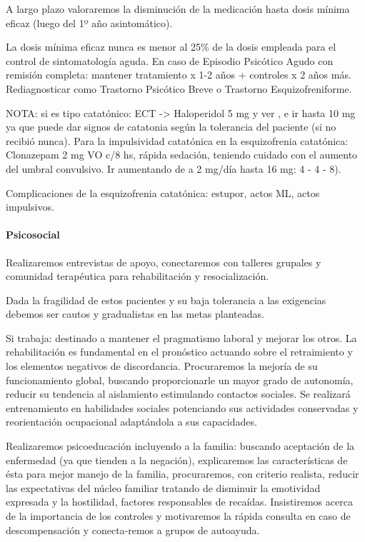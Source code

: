 A largo plazo valoraremos la disminución de la medicación hasta dosis mínima eficaz (luego del 1º año asintomático).

La dosis mínima eficaz nunca es menor al 25\% de la dosis empleada para el control de sintomatología aguda. En caso de Episodio Psicótico Agudo con remisión completa: mantener tratamiento x 1-2 años + controles x 2 años más. Rediagnosticar como Trastorno Psicótico Breve o Trastorno Esquizofreniforme.

NOTA: si es tipo catatónico: ECT -> Haloperidol 5 mg y ver , e ir hasta 10 mg ya que puede dar signos de catatonia según la tolerancia del paciente (si no recibió nunca). Para la impulsividad catatónica en la esquizofrenia catatónica: Clonazepam 2 mg VO c/8 hs, rápida sedación, teniendo cuidado con el aumento del umbral convulsivo. Ir aumentando de a 2 mg/día hasta 16 mg: 4 - 4 - 8).

Complicaciones de la esquizofrenia catatónica: estupor, actos ML, actos impulsivos.
\paragraph*{Psicosocial}
Realizaremos entrevistas de apoyo, conectaremos con talleres grupales y comunidad terapéutica para rehabilitación y resocialización.

Dada la fragilidad de estos pacientes y su baja tolerancia a las exigencias debemos ser cautos y gradualistas en las metas planteadas.

Si trabaja: destinado a mantener el pragmatismo laboral y mejorar los otros. La rehabilitación es fundamental en el pronóstico actuando sobre el retraimiento y los elementos negativos de discordancia. Procuraremos la mejoría de su funcionamiento global, buscando proporcionarle un mayor grado de autonomía, reducir su tendencia al aislamiento estimulando contactos sociales. Se realizará entrenamiento en habilidades sociales potenciando sus actividades conservadas y reorientación ocupacional adaptándola a sus capacidades.

Realizaremos psicoeducación incluyendo a la familia: buscando aceptación de la enfermedad (ya que tienden a la negación), explicaremos las características de ésta para mejor manejo de la familia, procuraremos, con criterio realista, reducir las expectativas del núcleo familiar tratando de disminuir la emotividad expresada y la hostilidad, factores responsables de recaídas. Insistiremos acerca de la importancia de los controles y motivaremos la rápida consulta en caso de descompensación y conecta-remos a grupos de autoayuda.

